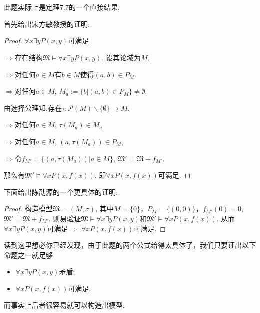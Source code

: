 \documentclass{article}
\begin{document}
\section{}
此题实际上是定理7.7的一个直接结果. 

首先给出宋方敏教授的证明:
\begin{proof}
$ \forall x \exists y  P(x, y) $可满足

$\Rightarrow$存在结构$\mathfrak{M} \models \forall x \exists y P(x, y)$. 设其论域为$M$. 

$\Rightarrow$对任何$a \in M$有$b \in M$使得$(a, b) \in P_M$. 

$\Rightarrow$对任何$a\in M$, $M_a := \{b|(a, b)\in P_M\} \neq \emptyset$.

由选择公理知,存在$\tau : \mathcal{P} (M) \backslash \{\emptyset\} \rightarrow M$. 



$\Rightarrow$对任何$a\in M$, $\tau(M_a) \in M_a$ 

$\Rightarrow$对任何$a\in M$, $(a,\tau(M_a)) \in P_M$, 

$\Rightarrow$令$f_{M'}=\{(a,\tau(M_a))|a \in M\}$, $\mathfrak{M'} = \mathfrak{M} +f_{M'}$.

那么有$\mathfrak{M'} \vDash \forall x P(x, f(x))$,
即$\forall x P(x, f(x))$可满足. 

\end{proof}

下面给出陈劭源的一个更具体的证明: 
\begin{proof}
	构造模型$\mathfrak{M} = (M, \sigma)$, 其中$M = \{0\}$，$P_M = \{(0, 0)\}$，$f_{M'}(0) = 0$, $\mathfrak{M'} = \mathfrak{M} + f_{M'}$. 则易验证$\mathfrak{M} \models \forall x \exists y P(x, y)$和$\mathfrak{M'} \models \forall x P(x, f(x))$. 从而$\forall x \exists y P(x, y)$可满足$\Rightarrow$ $\forall x P(x, f(x))$可满足. 
\end{proof}

读到这里想必你已经发现，由于此题的两个公式给得太具体了，我们只要证出以下命题之一就足够

\begin{itemize}
	\item $\forall x \exists y P(x, y)$矛盾; 
	\item $\forall x P(x, f(x))$可满足. 
\end{itemize}

而事实上后者很容易就可以构造出模型. 

\section{}
\end{document}
